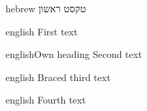 \documentclass{article}
\begin{document}
\begin{mekor}
\begin{mekorlang}{hebrew}
טקסט ראשון
\end{mekorlang}
\begin{mekorlang}[a subtitle]{english}
First text
\end{mekorlang}
\end{mekor}
\begin{mekor}
\begin{mekorlang}{english}{Own heading}
Second text
\end{mekorlang}
\end{mekor}
\begin{mekor}
\begin{mekorlang}{english}
{Braced} third text
\end{mekorlang}
\end{mekor}
\begin{mekor*}
\begin{mekorlang}{english}
Fourth text
\end{mekorlang}
\end{mekor*}
\end{document}
